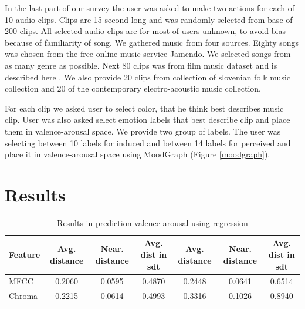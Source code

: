 \documentclass[a4paper]{article}
\begin{document}
In the last part of our survey the user was asked to make two actions for each of 10 audio clips. Clips are 15 second long and was randomly selected from base of 200 clips. All selected audio clips are for most of users unknown, to avoid bias because of familiarity of song. We gathered music from four sources. Eighty songs was chosen from the free online music service Jamendo. We selected songs from as many genre as possible. Next 80 clips was from film music dataset and is described here \cite{eerola2010comparison}. We also provide 20 clips from collection of slovenian folk music collection and 20 of the contemporary electro-acoustic music collection. 


For each clip we asked user to select color, that he think best describes music clip. User was also asked select emotion labels that best describe clip and place them in valence-arousal space. We provide two group of labels. The user was selecting between 10 labels for induced and between 14 labels for perceived and place it in valence-arousal space using MoodGraph (Figure \ref{moodgraph}). 

\section{Results}

\begin{table}[t]
\caption{Results in prediction valence arousal using regression}
\begin{tabular}{| l | c | c | c | c | c | c |}
\hline
Feature & Avg. distance & Near. distance & Avg. dist in sdt & Avg. distance & Near. distance & Avg. dist in sdt \\
\hline
MFCC & 0.2060 & 0.0595 & 0.4870 & 0.2448 & 0.0641 & 0.6514\\
Chroma & 0.2215 & 0.0614 & 0.4993 & 0.3316 & 0.1026 & 0.8940\\
\hline
\end{tabular}
\label{regressionresults}
\end{table}
\end{document}

